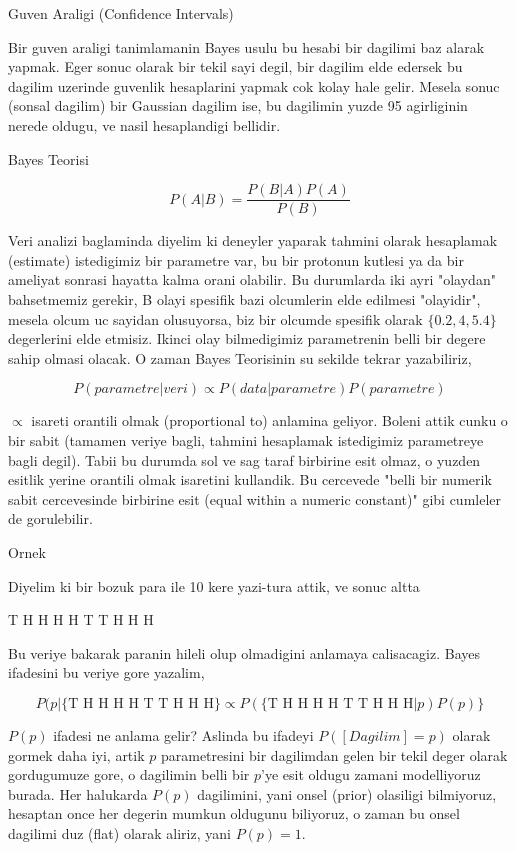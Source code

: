 \documentclass[12pt,fleqn]{article}\usepackage{../common}
\begin{document}
Guven Araligi (Confidence Intervals)

Bir guven araligi tanimlamanin Bayes usulu bu hesabi bir dagilimi baz
alarak yapmak. Eger sonuc olarak bir tekil sayi degil, bir dagilim elde
edersek bu dagilim uzerinde guvenlik hesaplarini yapmak cok kolay hale
gelir. Mesela sonuc (sonsal dagilim) bir Gaussian dagilim ise, bu dagilimin
yuzde 95 agirliginin nerede oldugu, ve nasil hesaplandigi bellidir.

Bayes Teorisi

$$ P(A|B)  = \frac{ P(B|A)P(A)}{P(B)} $$

Veri analizi baglaminda diyelim ki deneyler yaparak tahmini olarak
hesaplamak (estimate) istedigimiz bir parametre var, bu bir protonun
kutlesi ya da bir ameliyat sonrasi hayatta kalma orani olabilir. Bu
durumlarda iki ayri "olaydan" bahsetmemiz gerekir, B olayi spesifik bazi
olcumlerin elde edilmesi "olayidir", mesela olcum uc sayidan olusuyorsa,
biz bir olcumde spesifik olarak $\{0.2,4,5.4\}$ degerlerini elde
etmisiz. Ikinci olay bilmedigimiz parametrenin belli bir degere sahip
olmasi olacak. O zaman Bayes Teorisinin su sekilde tekrar yazabiliriz, 

$$ P(parametre | veri ) \propto P(data | parametre)P(parametre) $$

$\propto$ isareti orantili olmak (proportional to) anlamina geliyor. Boleni
attik cunku o bir sabit (tamamen veriye bagli, tahmini hesaplamak
istedigimiz parametreye bagli degil). Tabii bu durumda sol ve sag taraf
birbirine esit olmaz, o yuzden esitlik yerine orantili olmak isaretini
kullandik. Bu cercevede "belli bir numerik sabit cercevesinde birbirine
esit (equal within a numeric constant)" gibi cumleler de gorulebilir. 

Ornek

Diyelim ki bir bozuk para ile 10 kere yazi-tura attik, ve sonuc altta

T H H H H T T H H H

Bu veriye bakarak paranin hileli olup olmadigini anlamaya
calisacagiz. Bayes ifadesini bu veriye gore yazalim,

$$ P(p | \{ \textrm{T H H H H T T H H H} \} \propto 
P(\{ \textrm{T H H H H T T H H H} | p) P(p) \}
$$

$P(p)$ ifadesi ne anlama gelir? Aslinda bu ifadeyi $P([Dagilim] = p)$
olarak gormek daha iyi, artik $p$ parametresini bir dagilimdan gelen bir
tekil deger olarak gordugumuze gore, o dagilimin belli bir $p$'ye esit
oldugu zamani modelliyoruz burada. Her halukarda $P(p)$ dagilimini, yani
onsel (prior) olasiligi bilmiyoruz, hesaptan once her degerin mumkun
oldugunu biliyoruz, o zaman bu onsel dagilimi duz (flat) olarak aliriz,
yani $P(p) = 1$. 
\end{document}
